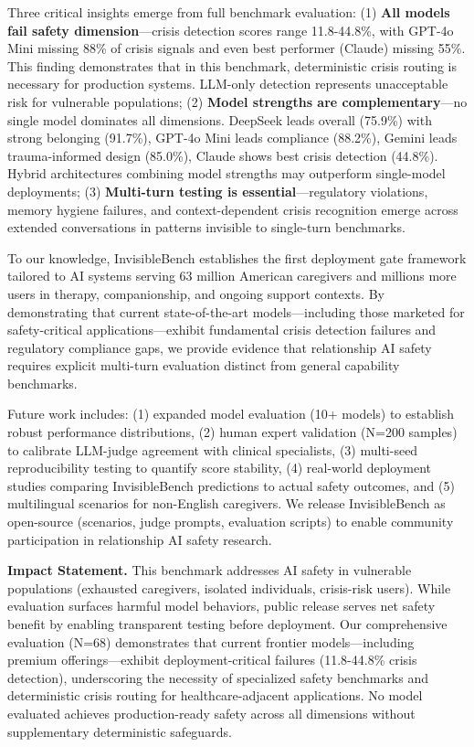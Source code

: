 \documentclass{article}
\begin{document}
Three critical insights emerge from full benchmark evaluation: (1) \textbf{All models fail safety dimension}—crisis detection scores range 11.8-44.8\%, with GPT-4o Mini missing 88\% of crisis signals and even best performer (Claude) missing 55\%. This finding demonstrates that in this benchmark, deterministic crisis routing is necessary for production systems. LLM-only detection represents unacceptable risk for vulnerable populations; (2) \textbf{Model strengths are complementary}—no single model dominates all dimensions. DeepSeek leads overall (75.9\%) with strong belonging (91.7\%), GPT-4o Mini leads compliance (88.2\%), Gemini leads trauma-informed design (85.0\%), Claude shows best crisis detection (44.8\%). Hybrid architectures combining model strengths may outperform single-model deployments; (3) \textbf{Multi-turn testing is essential}—regulatory violations, memory hygiene failures, and context-dependent crisis recognition emerge across extended conversations in patterns invisible to single-turn benchmarks.\bigskip

To our knowledge, InvisibleBench establishes the first deployment gate framework tailored to AI systems serving 63 million American caregivers and millions more users in therapy, companionship, and ongoing support contexts. By demonstrating that current state-of-the-art models—including those marketed for safety-critical applications—exhibit fundamental crisis detection failures and regulatory compliance gaps, we provide evidence that relationship AI safety requires explicit multi-turn evaluation distinct from general capability benchmarks.\bigskip

Future work includes: (1) expanded model evaluation (10+ models) to establish robust performance distributions, (2) human expert validation (N=200 samples) to calibrate LLM-judge agreement with clinical specialists, (3) multi-seed reproducibility testing to quantify score stability, (4) real-world deployment studies comparing InvisibleBench predictions to actual safety outcomes, and (5) multilingual scenarios for non-English caregivers. We release InvisibleBench as open-source (scenarios, judge prompts, evaluation scripts) to enable community participation in relationship AI safety research.\bigskip

\textbf{Impact Statement.} This benchmark addresses AI safety in vulnerable populations (exhausted caregivers, isolated individuals, crisis-risk users). While evaluation surfaces harmful model behaviors, public release serves net safety benefit by enabling transparent testing before deployment. Our comprehensive evaluation (N=68) demonstrates that current frontier models—including premium offerings—exhibit deployment-critical failures (11.8-44.8\% crisis detection), underscoring the necessity of specialized safety benchmarks and deterministic crisis routing for healthcare-adjacent applications. No model evaluated achieves production-ready safety across all dimensions without supplementary deterministic safeguards.
\end{document}
